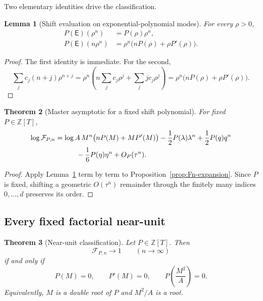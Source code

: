 \documentclass[11pt,oneside]{article}
\newtheorem{theorem}{Theorem}[section]
\newtheorem{lemma}[theorem]{Lemma}
\theoremstyle{definition}
\theoremstyle{remark}
\newcommand{\Z}{\mathbb Z}
\newcommand{\EF}{\mathsf E}
\newcommand{\cF}{\mathcal F}
\begin{document}
Two elementary identities drive the classification.

\begin{lemma}[Shift evaluation on exponential-polynomial modes]
\label{lem:shift-modes}
For every $\rho>0$,
\begin{align}
 P(\EF)(\rho^n)&=P(\rho)\rho^n,
 \label{eq:shift-exp}\\
 P(\EF)(n\rho^n)&=\rho^n\bigl(nP(\rho)+\rho P'(\rho)\bigr).
 \label{eq:shift-nexp}
\end{align}
\end{lemma}

\begin{proof}
The first identity is immediate.  For the second,
\[
 \sum_jc_j(n+j)\rho^{n+j}
 =\rho^n\left(n\sum_jc_j\rho^j+
                  \sum_jjc_j\rho^j\right)
 =\rho^n\bigl(nP(\rho)+\rho P'(\rho)\bigr).
\]
\end{proof}

\begin{theorem}[Master asymptotic for a fixed shift polynomial]
\label{thm:master-asymptotic}
For fixed $P\in\Z[T]$,
\begin{align}
 \log\cF_{P,n}
 &=\log A\,M^n\bigl(nP(M)+MP'(M)\bigr)
   -\frac12P(\lambda)\lambda^n
   +\frac12P(q)q^n\notag\\
 &\hspace{3em}
   -\frac16P(\eta)\eta^n
   +O_P(\tau^n).
 \label{eq:master-asymptotic}
\end{align}
\end{theorem}

\begin{proof}
Apply Lemma~\ref{lem:shift-modes} term by term to
Proposition~\ref{prop:Fn-expansion}.  Since $P$ is fixed, shifting a geometric
$O(\tau^n)$ remainder through the finitely many indices $0,\ldots,d$ preserves its order.
\end{proof}

\subsection{Every fixed factorial near-unit}

\begin{theorem}[Near-unit classification]
\label{thm:near-unit-classification}
Let $P\in\Z[T]$.  Then
\begin{equation}
 \cF_{P,n}\longrightarrow1
 \qquad(n\to\infty)
 \label{eq:near-unit-limit}
\end{equation}
if and only if
\begin{equation}
 P(M)=0,
 \qquad P'(M)=0,
 \qquad P\!\left(\frac{M^2}{A}\right)=0.
 \label{eq:three-annihilation-conditions}
\end{equation}
Equivalently, $M$ is a double root of $P$ and $M^2/A$ is a root.
\end{theorem}
\end{document}
